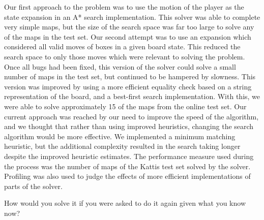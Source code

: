 \documentclass[a4paper,11pt]{article}
\begin{document}
Our first approach to the problem was to use the motion of the player as the
state expansion in an A* search implementation. This solver was able to complete
very simple maps, but the size of the search space was far too large to solve
any of the maps in the test set. Our second attempt was to use an expansion
which considered all valid moves of boxes in a given board state. This reduced
the search space to only those moves which were relevant to solving the
problem. Once all bugs had been fixed, this version of the solver could solve a
small number of maps in the test set, but continued to be hampered by
slowness. This version was improved by using a more efficient equality check
based on a string representation of the board, and a best-first search
implementation. With this, we were able to solve approximately 15 of the maps
from the online test set. Our current approach was reached by our need to
improve the speed of the algorithm, and we thought that rather than using
improved heuristics, changing the search algorithm would be more effective. We
implemented a minimum matching heuristic, but the additional complexity resulted
in the search taking longer despite the improved heuristic estimates. The
performance measure used during the process was the number of maps of the Kattis
test set solved by the solver. Profiling was also used to judge the effects of
more efficient implementations of parts of the solver.

How would you solve it if you were asked to do it again given what you know now?

\printbibliography
\end{document}
